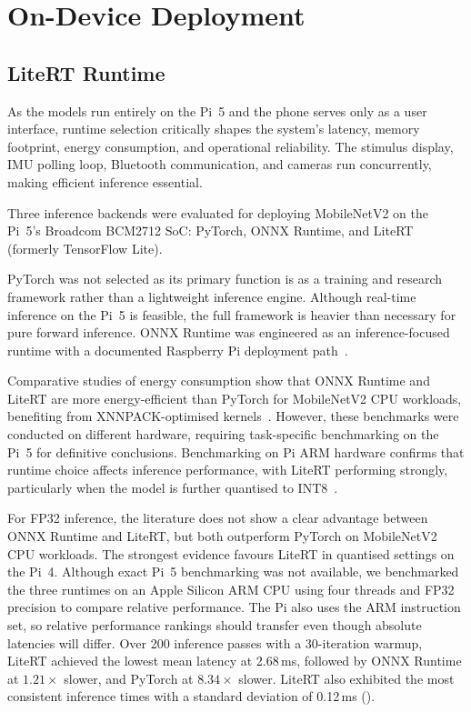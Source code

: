 \section{On-Device Deployment}

\subsection{LiteRT Runtime}
\label{sec:litert}

As the models run entirely on the Pi~5 and the phone serves only as a user interface, runtime selection critically shapes the system's latency, memory footprint, energy consumption, and operational reliability. The stimulus display, IMU polling loop, Bluetooth communication, and cameras run concurrently, making efficient inference essential.

Three inference backends were evaluated for deploying MobileNetV2 on the Pi~5's Broadcom BCM2712 SoC: PyTorch, ONNX Runtime, and LiteRT (formerly TensorFlow Lite).

PyTorch was not selected as its primary function is as a training and research framework rather than a lightweight inference engine. Although real-time inference on the Pi~5 is feasible, the full framework is heavier than necessary for pure forward inference. ONNX Runtime was engineered as an inference-focused runtime with a documented Raspberry Pi deployment path~\cite{onnxruntime2021}.

Comparative studies of energy consumption show that ONNX Runtime and LiteRT are more energy-efficient than PyTorch for MobileNetV2 CPU workloads, benefiting from XNNPACK-optimised kernels~\cite{malenza2025energy}. However, these benchmarks were conducted on different hardware, requiring task-specific benchmarking on the Pi~5 for definitive conclusions. Benchmarking on Pi ARM hardware confirms that runtime choice affects inference performance, with LiteRT performing strongly, particularly when the model is further quantised to INT8~\cite{baller2021deepedgebench}.

For FP32 inference, the literature does not show a clear advantage between ONNX Runtime and LiteRT, but both outperform PyTorch on MobileNetV2 CPU workloads. The strongest evidence favours LiteRT in quantised settings on the Pi~4. Although exact Pi~5 benchmarking was not available, we benchmarked the three runtimes on an Apple Silicon ARM CPU using four threads and FP32 precision to compare relative performance. The Pi also uses the ARM instruction set, so relative performance rankings should transfer even though absolute latencies will differ. Over 200 inference passes with a 30-iteration warmup, LiteRT achieved the lowest mean latency at 2.68\,ms, followed by ONNX Runtime at $1.21\times$ slower, and PyTorch at $8.34\times$ slower. LiteRT also exhibited the most consistent inference times with a standard deviation of 0.12\,ms ().

